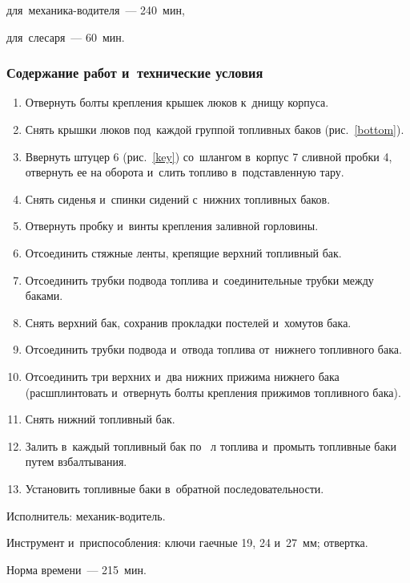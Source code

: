 \begin{standarttime}
    \item для~механика-водителя~--- 240~мин,
    \item для~слесаря~--- 60~мин. 
\end{standarttime}

\subsubsection{Содержание работ и~технические условия}
\begin{enumerate}
    \item Отвернуть болты крепления крышек люков к~днищу корпуса. 
    \item Снять крышки люков под~каждой группой топливных баков (рис.~\ref{bottom}). 
    \item Ввернуть штуцер 6 (рис.~\ref{key}) со~шлангом в~корпус 7 сливной пробки 4, отвернуть ее на  оборота и~слить топливо в~подставленную тару. 
    \item Снять сиденья и~спинки сидений с~нижних топливных баков. 
    \item Отвернуть пробку и~винты крепления заливной горловины. 
    \item Отсоединить стяжные ленты, крепящие верхний топливный бак. 
    \item Отсоединить трубки подвода топлива и~соединительные трубки между баками. 
    \item Снять верхний бак, сохранив прокладки постелей и~хомутов бака. 
    \item Отсоединить трубки подвода и~отвода топлива от~нижнего топливного бака. 
    \item Отсоединить три верхних и~два нижних прижима нижнего бака (расшплинтовать и~отвернуть болты крепления прижимов топливного бака). 
    \item Снять нижний топливный бак. 
    \item Залить в~каждый топливный бак по ~л топлива и~промыть топливные баки путем взбалтывания. 
    \item Установить топливные баки в~обратной последовательности.
\end{enumerate}

\noindent
Исполнитель: механик-водитель.

\noindent
Инструмент и~приспособления: ключи гаечные 19, 24 и~27~мм; отвертка. 

\noindent
Норма времени~--- 215~мин. 

